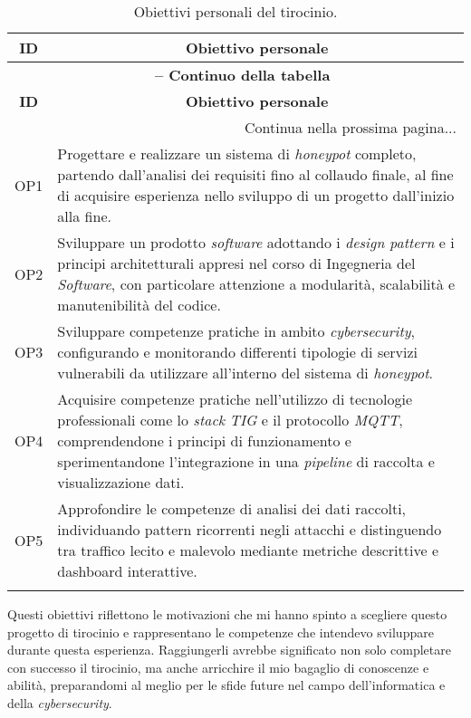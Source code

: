 \begin{center}
\begin{longtable}{|p{}|p{}|}
\hline
\multicolumn{1}{|c|}{\textbf{ID}} & \multicolumn{1}{c|}{\textbf{Obiettivo personale}}\\ 
\hline 
\endfirsthead
\multicolumn{2}{c}{{\bfseries \tablename\ \thetable{} -- Continuo della tabella}}\\
\hline
\multicolumn{1}{|c|}{\textbf{ID}} & \multicolumn{1}{c|}{\textbf{Obiettivo personale}}\\ \hline 
\endhead
\hline
\multicolumn{2}{|r|}{{Continua nella prossima pagina...}}\\
\hline
\endfoot
\endlastfoot 

OP1 & Progettare e realizzare un sistema di \textit{honeypot} completo, partendo dall'analisi dei requisiti fino al collaudo finale, al fine di acquisire esperienza nello sviluppo di un progetto dall'inizio alla fine. \\ \hline
OP2 & Sviluppare un prodotto \textit{software} adottando i \textit{design pattern} e i principi architetturali appresi nel corso di Ingegneria del \textit{Software}, con particolare attenzione a modularità, scalabilità e manutenibilità del codice. \\ \hline
OP3 & Sviluppare competenze pratiche in ambito \textit{cybersecurity}, configurando e monitorando differenti tipologie di servizi vulnerabili da utilizzare all'interno del sistema di \textit{honeypot}. \\ \hline
OP4 & Acquisire competenze pratiche nell'utilizzo di tecnologie professionali come lo \textit{stack} \textit{TIG} e il protocollo \textit{MQTT}, comprendendone i principi di funzionamento e sperimentandone l'integrazione in una \textit{pipeline} di raccolta e visualizzazione dati. \\ \hline
OP5 & Approfondire le competenze di analisi dei dati raccolti, individuando pattern ricorrenti negli attacchi e distinguendo tra traffico lecito e malevolo mediante metriche descrittive e dashboard interattive. \\ \hline

\caption{Obiettivi personali del tirocinio.}
\label{tab:obiettivi-personali}
\end{longtable}
\end{center}
Questi obiettivi riflettono le motivazioni che mi hanno spinto a scegliere questo progetto di tirocinio e rappresentano le competenze che intendevo sviluppare durante questa esperienza. Raggiungerli avrebbe significato non solo completare con successo il tirocinio, ma anche arricchire il mio bagaglio di conoscenze e abilità, preparandomi al meglio per le sfide future nel campo dell'informatica e della \textit{cybersecurity}.